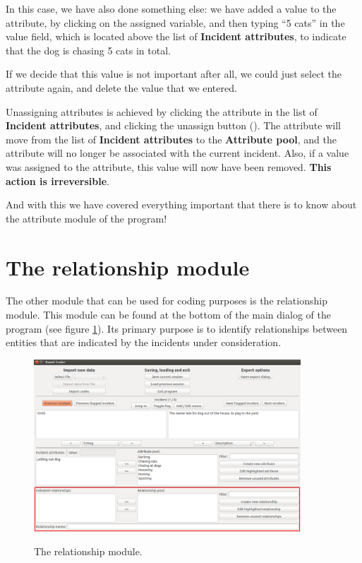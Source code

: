 \documentclass{memoir}
\begin{document}
In this case, we have also done something else: we have added a value to the attribute, by clicking on the assigned variable, and then typing ``5 cats'' in the value field, which is located above the list of \textbf{Incident attributes}, to indicate that the dog is chasing 5 cats in total.

If we decide that this value is not important after all, we could just select the attribute again, and delete the value that we entered.

Unassigning attributes is achieved by clicking the attribute in the list of \textbf{Incident attributes}, and clicking the unassign button (\textbf{\guillemotright}). The attribute will move from the list of \textbf{Incident attributes} to the \textbf{Attribute pool}, and the attribute will no longer be associated with the current incident. Also, if a value was assigned to the attribute, this value will now have been removed. \textbf{This action is irreversible}. 

And with this we have covered everything important that there is to know about the attribute module of the program!

\section{The relationship module}
\label{sec:relationshipmodule}

The other module that can be used for coding purposes is the relationship module. This module can be found at the bottom of the main dialog of the program (see figure \ref{fig:relationshipmodule}). Its primary purpose is to identify relationships between entities that are indicated by the incidents under consideration. 
\begin{figure}[h!]
  \centering
  \caption{The relationship module.}
  \includegraphics[width=100mm]{Screenshot_14.pdf}
  \label{fig:relationshipmodule}
\end{figure}
\end{document}
